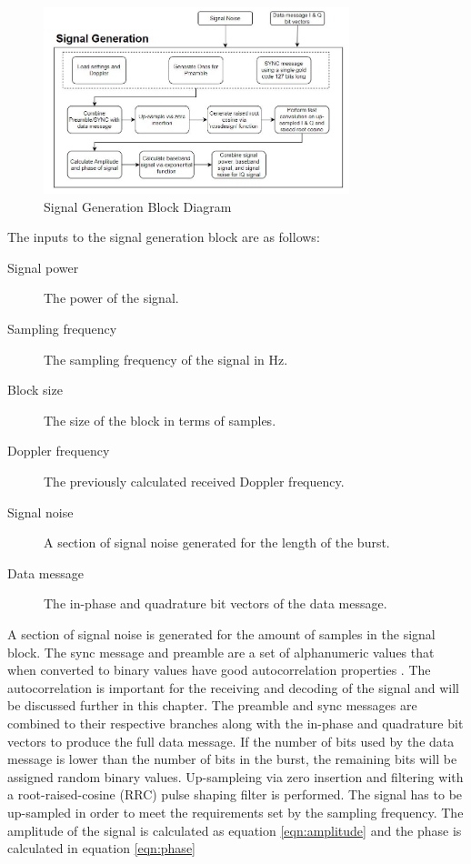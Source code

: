 \documentclass[12pt]{report}
\begin{document}
\begin{figure}[h]
    \centering
    \includegraphics[width=3.5in]{SignalGenBlockDiagram}
    \caption{Signal Generation Block Diagram}
    \label{fig:SigGenBlock}
\end{figure}
The inputs to the signal generation block are as follows:
\begin{description}
    \item[Signal power] The power of the signal.
    \item[Sampling frequency] The sampling frequency of the signal in Hz.
    \item[Block size] The size of the block in terms of samples.
    \item[Doppler frequency] The previously calculated received Doppler frequency. 
    \item[Signal noise] A section of signal noise generated for the length of the burst.
    \item[Data message] The in-phase and quadrature bit vectors of the data message.
\end{description}

A section of signal noise is generated for the amount of samples in the signal block. The sync message and preamble are a set of alphanumeric values that when converted to binary values have good autocorrelation properties \cite{dinanSpreadingCodesDirect1998}. The autocorrelation is important for the receiving and decoding of the signal and will be discussed further in this chapter. The preamble and sync messages are combined to their respective branches along with the in-phase and quadrature bit vectors to produce the full data message. If the number of bits used by the data message is lower than the number of bits in the burst, the remaining bits will be assigned random binary values. Up-sampleing via zero insertion and filtering with a root-raised-cosine (RRC) pulse shaping filter is performed. The signal has to be up-sampled in order to meet the requirements set by the sampling frequency. The amplitude of the signal is calculated as equation \ref{eqn:amplitude} and the phase is calculated in equation \ref{eqn:phase}
\end{document}
